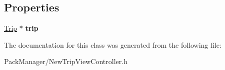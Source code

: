 \subsection*{Properties}
\begin{DoxyCompactItemize}
\item 
\hypertarget{interface_new_trip_view_controller_a5199fd760623504723770ee4dbf3cd2f}{\hyperlink{interface_trip}{Trip} $\ast$ {\bfseries trip}}\label{interface_new_trip_view_controller_a5199fd760623504723770ee4dbf3cd2f}

\end{DoxyCompactItemize}


The documentation for this class was generated from the following file\-:\begin{DoxyCompactItemize}
\item 
Pack\-Manager/New\-Trip\-View\-Controller.\-h\end{DoxyCompactItemize}

